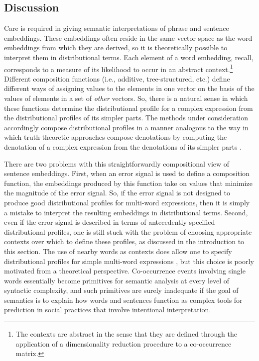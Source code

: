 \subsection{Discussion}

Care is required in giving semantic interpretations of phrase and sentence embeddings. These embeddings often reside in the same vector space as the word embeddings from which they are derived, so it is theoretically possible to interpret them in distributional terms. Each element of a word embedding, recall, corresponds to a measure of its likelihood to occur in an abstract context.\footnote{The contexts are abstract in the sense that they are defined through the application of a dimensionality reduction procedure to a co-occurrence matrix.} Different composition functions (i.e., additive, tree-structured, etc.) define different ways of assigning values to the elements in one vector on the basis of the values of elements in a set of \textit{other} vectors. So, there is a natural sense in which these functions determine the distributional profile for a complex expression from the distributional profiles of its simpler parts. The methods under consideration accordingly compose distributional profiles in a manner analogous to the way in which truth-theoretic approaches compose denotations by computing the denotation of a complex expression from the denotations of its simpler parts \citep{Carpenter:1997}. 

There are two problems with this straightforwardly compositional view of sentence embeddings. First, when an error signal is used to define a composition function, the embeddings produced by this function take on values that minimize the magnitude of the error signal. So, if the error signal is not designed to produce good distributional profiles for multi-word expressions, then it is simply a mistake to interpret the resulting embeddings in distributional terms. Second, even if the error signal is described in terms of antecedently specified distributional profiles, one is still stuck with the problem of choosing appropriate contexts over which to define these profiles, as discussed in the introduction to this section. The use of nearby words as contexts does allow one to specify distributional profiles for simple multi-word expressions \citep[see][pp. 290-95]{Baroni:2014}, but this choice is poorly motivated from a theoretical perspective. Co-occurrence events involving single words essentially become primitives for semantic analysis at every level of syntactic complexity, and such primitives are surely inadequate if the goal of semantics is to explain how words and sentences function as complex tools for prediction in social practices that involve intentional interpretation. 

